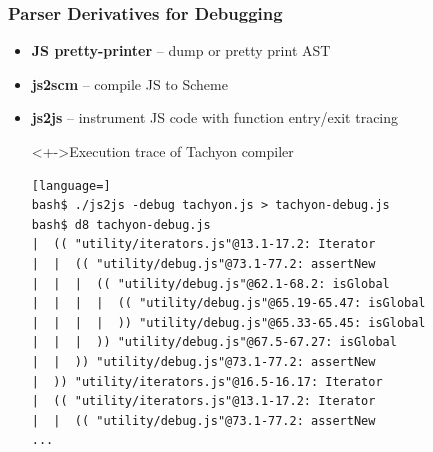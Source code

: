 \begin{frame}[fragile]
\frametitle{\bf Parser Derivatives for Debugging}

  \begin{itemize}

  \item {\bf JS pretty-printer} -- dump or pretty print AST
    \smallskip

  \item {\bf js2scm} -- compile JS to Scheme
    \smallskip

  \item {\bf js2js} -- instrument JS code with function entry/exit tracing
    \smallskip

\begin{block}<+->{Execution trace of Tachyon compiler}
\begin{lstlisting}[language=]
bash$ ./js2js -debug tachyon.js > tachyon-debug.js
bash$ d8 tachyon-debug.js
|  (( "utility/iterators.js"@13.1-17.2: Iterator
|  |  (( "utility/debug.js"@73.1-77.2: assertNew
|  |  |  (( "utility/debug.js"@62.1-68.2: isGlobal
|  |  |  |  (( "utility/debug.js"@65.19-65.47: isGlobal
|  |  |  |  )) "utility/debug.js"@65.33-65.45: isGlobal
|  |  |  )) "utility/debug.js"@67.5-67.27: isGlobal
|  |  )) "utility/debug.js"@73.1-77.2: assertNew
|  )) "utility/iterators.js"@16.5-16.17: Iterator
|  (( "utility/iterators.js"@13.1-17.2: Iterator
|  |  (( "utility/debug.js"@73.1-77.2: assertNew
...
\end{lstlisting}
\end{block}

  \end{itemize}

\end{frame}
